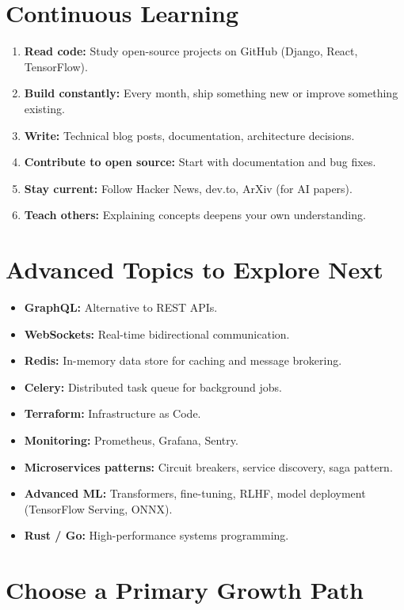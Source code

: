 \documentclass[12pt, a4paper, oneside]{book}
\begin{document}
\section{Continuous Learning}
\begin{enumerate}[leftmargin=2em]
    \item \textbf{Read code:} Study open-source projects on GitHub (Django, React, TensorFlow).
    \item \textbf{Build constantly:} Every month, ship something new or improve something existing.
    \item \textbf{Write:} Technical blog posts, documentation, architecture decisions.
    \item \textbf{Contribute to open source:} Start with documentation and bug fixes.
    \item \textbf{Stay current:} Follow Hacker News, dev.to, ArXiv (for AI papers).
    \item \textbf{Teach others:} Explaining concepts deepens your own understanding.
\end{enumerate}

\section{Advanced Topics to Explore Next}

\begin{itemize}[leftmargin=2em]
    \item \textbf{GraphQL:} Alternative to REST APIs.
    \item \textbf{WebSockets:} Real-time bidirectional communication.
    \item \textbf{Redis:} In-memory data store for caching and message brokering.
    \item \textbf{Celery:} Distributed task queue for background jobs.
    \item \textbf{Terraform:} Infrastructure as Code.
    \item \textbf{Monitoring:} Prometheus, Grafana, Sentry.
    \item \textbf{Microservices patterns:} Circuit breakers, service discovery, saga pattern.
    \item \textbf{Advanced ML:} Transformers, fine-tuning, RLHF, model deployment (TensorFlow Serving, ONNX).
    \item \textbf{Rust / Go:} High-performance systems programming.
\end{itemize}

\section{Choose a Primary Growth Path}
\end{document}
